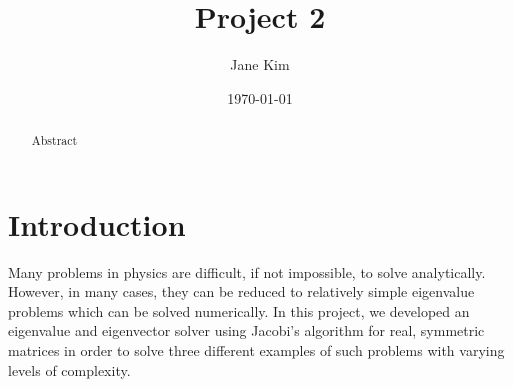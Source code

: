 \documentclass[prb,aps,twocolumn,showpacs,10pt]{revtex4-1}
\begin{document}
\title {Project 2}

\author{Jane Kim}
\date{\today}


\begin{abstract}
\noindent Abstract\\
\end{abstract}



\maketitle

\section{Introduction}

Many problems in physics are difficult, if not impossible, to solve analytically. However, in many cases, they can be reduced to relatively simple eigenvalue problems which can be solved numerically. In this project, we developed an eigenvalue and eigenvector solver using Jacobi's algorithm for real, symmetric matrices in order to solve three different examples of such problems with varying levels of complexity.
\end{document}
